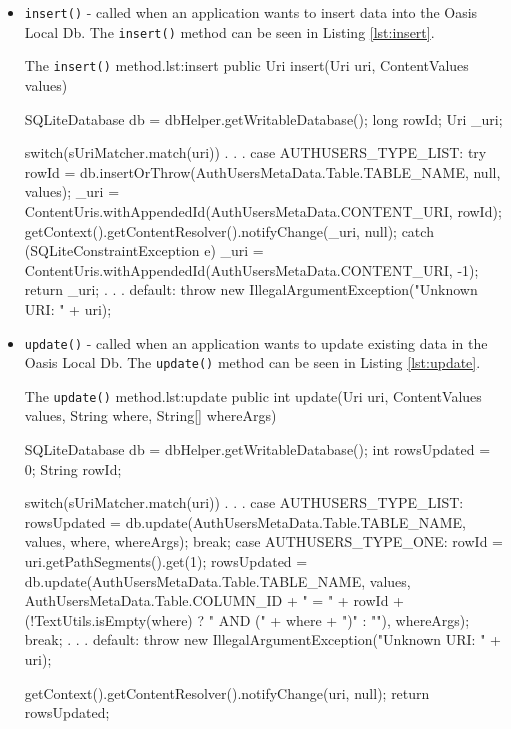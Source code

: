 \begin{itemize}
	\item \texttt{insert()} - called when an application wants to insert data into the Oasis Local Db. The \texttt{insert()} method can be seen in Listing \vref{lst:insert}.
	
		\begin{Java}{The \texttt{insert()} method.}{lst:insert}
			public Uri insert(Uri uri, ContentValues values) {
				SQLiteDatabase db = dbHelper.getWritableDatabase();
				long rowId;
				Uri _uri;

				switch(sUriMatcher.match(uri)) {
				.
				.
				.
				case AUTHUSERS_TYPE_LIST:
					try {
						rowId = db.insertOrThrow(AuthUsersMetaData.Table.TABLE_NAME, null, values);
						_uri = ContentUris.withAppendedId(AuthUsersMetaData.CONTENT_URI, rowId);
						getContext().getContentResolver().notifyChange(_uri, null);
					} catch (SQLiteConstraintException e) {
						_uri = ContentUris.withAppendedId(AuthUsersMetaData.CONTENT_URI, -1);
					}
					return _uri;
				.
				.
				.
				default:
					throw new IllegalArgumentException("Unknown URI: " + uri);
				}
			}
		\end{Java}
	
	\item \texttt{update()} - called when an application wants to update existing data in the Oasis Local Db. The \texttt{update()} method can be seen in Listing \vref{lst:update}.
	
		\begin{Java}{The \texttt{update()} method.}{lst:update}
			public int update(Uri uri, ContentValues values, String where, String[] whereArgs) {
				SQLiteDatabase db = dbHelper.getWritableDatabase();
				int rowsUpdated = 0;
				String rowId;

				switch(sUriMatcher.match(uri)) {
				.
				.
				.
				case AUTHUSERS_TYPE_LIST:
					rowsUpdated = db.update(AuthUsersMetaData.Table.TABLE_NAME, values, where, whereArgs);
					break;
				case AUTHUSERS_TYPE_ONE:
					rowId = uri.getPathSegments().get(1);
					rowsUpdated = db.update(AuthUsersMetaData.Table.TABLE_NAME,
							values,
							AuthUsersMetaData.Table.COLUMN_ID + " = " + rowId + (!TextUtils.isEmpty(where) ? " AND (" + where + ")" : ""),
							whereArgs);
					break;
				.
				.
				.
				default:
					throw new IllegalArgumentException("Unknown URI: " + uri);
				}

				getContext().getContentResolver().notifyChange(uri, null);
				return rowsUpdated;
			}
		\end{Java}
	

\end{itemize}
